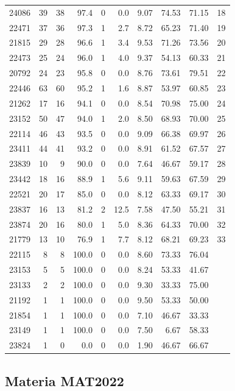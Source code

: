 \begin{longtable}{lrrrrrrrrr}
24086 & 39 & 38 & 97.4 & 0 & 0.0 & 9.07 & 74.53 & 71.15 & 18 \\
22471 & 37 & 36 & 97.3 & 1 & 2.7 & 8.72 & 65.23 & 71.40 & 19 \\
21815 & 29 & 28 & 96.6 & 1 & 3.4 & 9.53 & 71.26 & 73.56 & 20 \\
22473 & 25 & 24 & 96.0 & 1 & 4.0 & 9.37 & 54.13 & 60.33 & 21 \\
20792 & 24 & 23 & 95.8 & 0 & 0.0 & 8.76 & 73.61 & 79.51 & 22 \\
22446 & 63 & 60 & 95.2 & 1 & 1.6 & 8.87 & 53.97 & 60.85 & 23 \\
21262 & 17 & 16 & 94.1 & 0 & 0.0 & 8.54 & 70.98 & 75.00 & 24 \\
23152 & 50 & 47 & 94.0 & 1 & 2.0 & 8.50 & 68.93 & 70.00 & 25 \\
22114 & 46 & 43 & 93.5 & 0 & 0.0 & 9.09 & 66.38 & 69.97 & 26 \\
23411 & 44 & 41 & 93.2 & 0 & 0.0 & 8.91 & 61.52 & 67.57 & 27 \\
23839 & 10 & 9 & 90.0 & 0 & 0.0 & 7.64 & 46.67 & 59.17 & 28 \\
23442 & 18 & 16 & 88.9 & 1 & 5.6 & 9.11 & 59.63 & 67.59 & 29 \\
22521 & 20 & 17 & 85.0 & 0 & 0.0 & 8.12 & 63.33 & 69.17 & 30 \\
23837 & 16 & 13 & 81.2 & 2 & 12.5 & 7.58 & 47.50 & 55.21 & 31 \\
23874 & 20 & 16 & 80.0 & 1 & 5.0 & 8.36 & 64.33 & 70.00 & 32 \\
21779 & 13 & 10 & 76.9 & 1 & 7.7 & 8.12 & 68.21 & 69.23 & 33 \\
22115 & 8 & 8 & 100.0 & 0 & 0.0 & 8.60 & 73.33 & 76.04 &  \\
23153 & 5 & 5 & 100.0 & 0 & 0.0 & 8.24 & 53.33 & 41.67 &  \\
23133 & 2 & 2 & 100.0 & 0 & 0.0 & 9.30 & 33.33 & 75.00 &  \\
21192 & 1 & 1 & 100.0 & 0 & 0.0 & 9.50 & 53.33 & 50.00 &  \\
21854 & 1 & 1 & 100.0 & 0 & 0.0 & 7.10 & 46.67 & 33.33 &  \\
23149 & 1 & 1 & 100.0 & 0 & 0.0 & 7.50 & 6.67 & 58.33 &  \\
23824 & 1 & 0 & 0.0 & 0 & 0.0 & 1.90 & 46.67 & 66.67 &  \\
\bottomrule
\end{longtable}
\endgroup

\subsection{Materia MAT2022}

